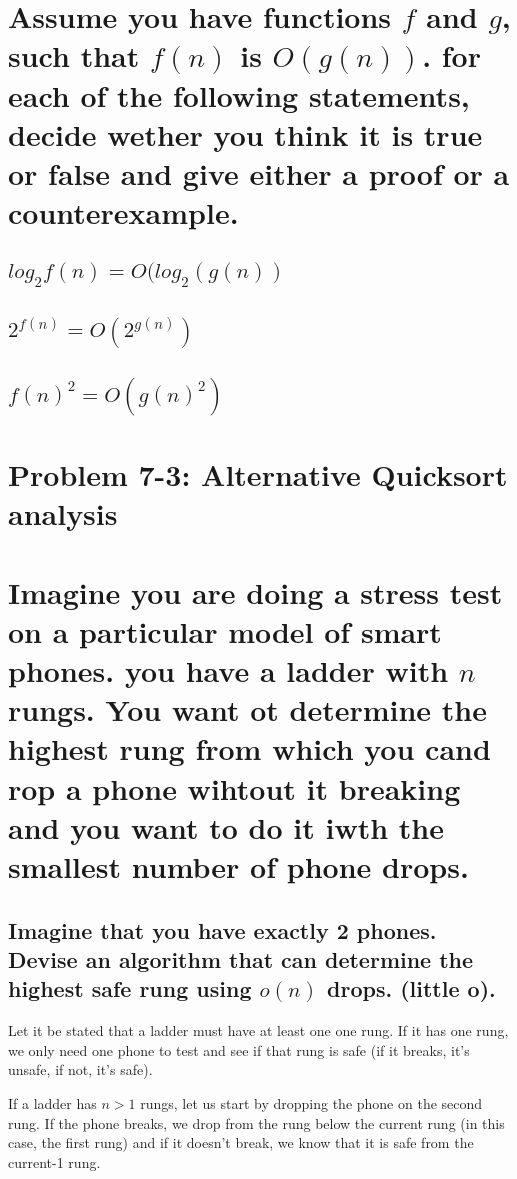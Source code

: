 \documentclass[titlepage]{article}\usepackage[]{graphicx}\usepackage[]{color}
\begin{document}
\section{ Assume you have functions $f$ and $g$, such that $f(n)$ is $O(g(n))$.
  for each of the following statements, decide wether you think it is true or false and give
either a proof or a counterexample. }

\subsection{ $log_2f(n) = O(log_2(g(n))$}



\subsection{ $2^{ f(n) } = O(2^{ g(n) })$}

\subsection{$  f(n)^2 = O(g(n)^2)$}

\section{ Problem 7-3: Alternative Quicksort analysis}

\section{
  Imagine you are doing a stress test on a particular model of smart phones. you
  have a ladder with $n$ rungs. You want ot determine the highest rung from which
  you cand rop a phone wihtout it breaking and you want to do it iwth the
smallest number of phone drops. }

\subsection{ Imagine that you have exactly 2 phones. Devise an algorithm that
  can determine
the highest safe rung using $o(n)$ drops. (little o). }

  Let it be stated that a ladder must have at least one one rung. If it has
  one rung, we only need one phone to test and see if that rung is safe (if it
  breaks, it's unsafe, if not, it's safe).

  If a ladder has $n > 1$ rungs, let us start by dropping the phone on the
  second rung. If the phone breaks, we drop from the rung below the current
  rung (in this case, the first rung) and if it doesn't break, we know that it
  is safe from the current-1 rung.
\end{document}
